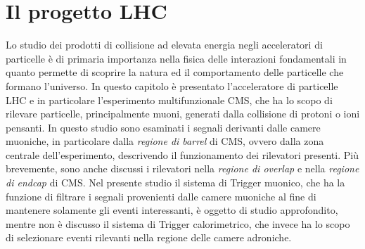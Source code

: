 \chapter{Il progetto LHC}
\label{cap:PrimoCapitolo}

\sloppy

Lo studio dei prodotti di collisione ad elevata energia negli acceleratori di particelle è di primaria importanza nella fisica delle interazioni fondamentali in quanto permette di scoprire la natura ed il comportamento delle particelle che formano l'universo. In questo capitolo è presentato l'acceleratore di particelle LHC e in particolare l'esperimento multifunzionale CMS, che ha lo scopo di rilevare particelle, principalmente muoni, generati dalla collisione di protoni o ioni pensanti. In questo studio sono esaminati i segnali derivanti dalle camere muoniche, in particolare dalla \textit{regione di barrel} di CMS, ovvero dalla zona centrale dell'esperimento, descrivendo il funzionamento dei rilevatori presenti. Più brevemente, sono anche discussi i rilevatori nella \textit{regione di overlap} e nella \textit{regione di endcap} di CMS. \newline
Nel presente studio il sistema di Trigger muonico, che ha la funzione di filtrare i segnali provenienti dalle camere muoniche al fine di mantenere solamente gli eventi interessanti, è oggetto di studio approfondito, mentre non è discusso il sistema di Trigger calorimetrico, che invece ha lo scopo di selezionare eventi rilevanti nella regione delle camere adroniche.

